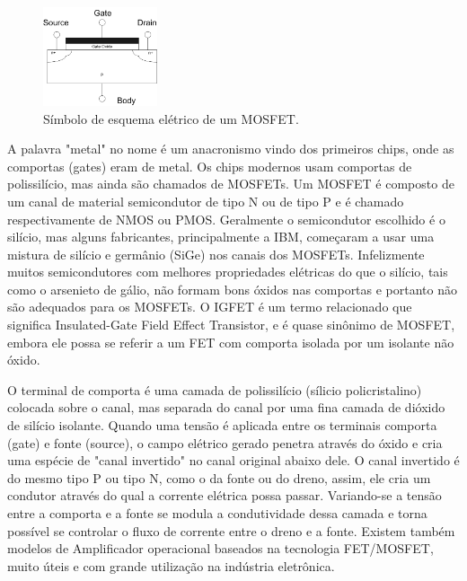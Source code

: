 \documentclass[12pt]{article}
\begin{document}
        \begin{figure}[htpb!]

            \centering
            \includegraphics[width=0.3\textwidth]{./images/FET_cross_section.png}
            \caption{Símbolo de esquema elétrico de um MOSFET.}

        \end{figure}



        A palavra "metal" no nome é um anacronismo vindo dos primeiros chips, onde as comportas (gates) eram de metal. Os chips modernos usam comportas de polissilício, mas ainda são chamados de MOSFETs. Um MOSFET é composto de um canal de material semicondutor de tipo N ou de tipo P e é chamado respectivamente de NMOS ou PMOS. Geralmente o semicondutor escolhido é o silício, mas alguns fabricantes, principalmente a IBM, começaram a usar uma mistura de silício e germânio (SiGe) nos canais dos MOSFETs. Infelizmente muitos semicondutores com melhores propriedades elétricas do que o silício, tais como o arsenieto de gálio, não formam bons óxidos nas comportas e portanto não são adequados para os MOSFETs. O IGFET é um termo relacionado que significa Insulated-Gate Field Effect Transistor, e é quase sinônimo de MOSFET, embora ele possa se referir a um FET com comporta isolada por um isolante não óxido.

        O terminal de comporta é uma camada de polissilício (sílicio policristalino) colocada sobre o canal, mas separada do canal por uma fina camada de dióxido de silício isolante. Quando uma tensão é aplicada entre os terminais comporta (gate) e fonte (source), o campo elétrico gerado penetra através do óxido e cria uma espécie de "canal invertido" no canal original abaixo dele. O canal invertido é do mesmo tipo P ou tipo N, como o da fonte ou do dreno, assim, ele cria um condutor através do qual a corrente elétrica possa passar. Variando-se a tensão entre a comporta e a fonte se modula a condutividade dessa camada e torna possível se controlar o fluxo de corrente entre o dreno e a fonte. Existem também modelos de Amplificador operacional baseados na tecnologia FET/MOSFET, muito úteis e com grande utilização na indústria eletrônica.
\end{document}
